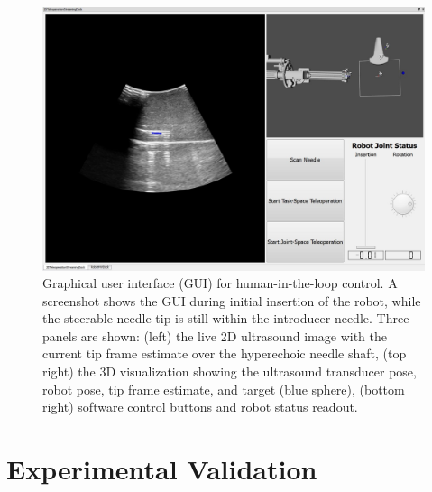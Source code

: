 \begin{figure}[!t]
\centering
\includegraphics[width = 0.9\columnwidth]{./Images/Chapter5/GUI/GUI.jpg}%
\caption[Human-in-the-loop GUI]{Graphical user interface (GUI) for human-in-the-loop control. A screenshot shows the GUI during initial insertion of the robot, while the steerable needle tip is still within the introducer needle. Three panels are shown: (left) the live 2D ultrasound image with the current tip frame estimate over the hyperechoic needle shaft, (top right) the 3D visualization showing the ultrasound transducer pose, robot pose, tip frame estimate, and target (blue sphere), (bottom right) software control buttons and robot status readout.}
\label{fig:GUI}
\end{figure}  

\section{Experimental Validation}
\label{sec:HumanInTheLoopValidation}
